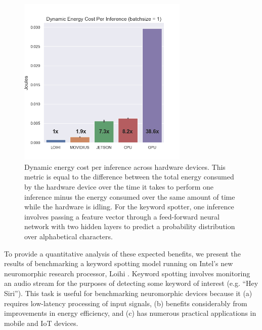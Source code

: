 \documentclass{article}
\begin{document}
\begin{figure}[ht!]
\centering
    \includegraphics[width=3.2in]{./figures/per_inf_comparison.png}
    \caption{Dynamic energy cost per inference across hardware devices. This metric is equal to the difference between the total energy consumed by the hardware device over the time it takes to perform one inference minus the energy consumed over the same amount of time while the hardware is idling. For the keyword spotter, one inference involves passing a feature vector through a feed-forward neural network with two hidden layers to predict a probability distribution over alphabetical characters.}
\label{per_inf_fig}
\end{figure}

To provide a quantitative analysis of these expected benefits, we present the results of benchmarking a keyword spotting model running on Intel's new neuromorphic research processor, Loihi \cite{Davies:2018}. Keyword spotting involves monitoring an audio stream for the purposes of detecting some keyword of interest (e.g. ``Hey Siri''). This task is useful for benchmarking neuromorphic devices because it (a) requires low-latency processing of input signals, (b) benefits considerably from improvements in energy efficiency, and (c) has numerous practical applications in mobile and IoT devices.
\end{document}
